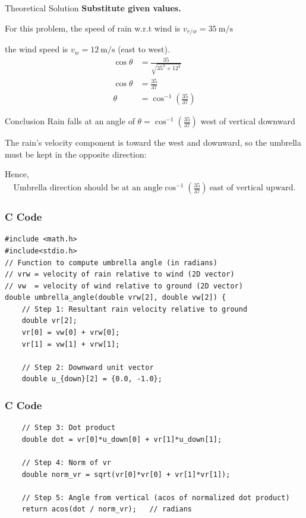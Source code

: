 \documentclass{beamer}
\begin{document}
\begin{frame}{Theoretical Solution}
\textbf{Substitute given values.}

For this problem, the speed of rain w.r.t wind is $v_{r/w}=35\ \text{m/s}$ 

the wind speed is $v_w=12\ \text{m/s}$ (east to west).
\begin{align}
    \cos\theta &= \frac{35}{\sqrt{35^2 + 12^2}} \\
    \cos\theta &= \frac{35}{37} \\ 
        \theta &= \cos^{-1}\!\left(\frac{35}{37}\right)
\end{align}

\end{frame}
\begin{frame}{Conclusion} 
Rain falls at an angle of 
$\theta=\cos^{-1}\!\left(\frac{35}{37}\right)$ west of vertical downward

The rain’s velocity component is toward the west and downward, so the umbrella must be kept in the opposite direction:

Hence,
\begin{align}
 \text{Umbrella direction should be at an angle} \cos^{-1}\!\left(\frac{35}{37}\right)\ \text{east of vertical upward.}
\end{align}

\end{frame}


\begin{frame}[fragile]
    \frametitle{C Code }
\begin{lstlisting}
#include <math.h>
#include<stdio.h>
// Function to compute umbrella angle (in radians)
// vrw = velocity of rain relative to wind (2D vector)
// vw  = velocity of wind relative to ground (2D vector)
double umbrella_angle(double vrw[2], double vw[2]) {
    // Step 1: Resultant rain velocity relative to ground
    double vr[2];
    vr[0] = vw[0] + vrw[0];
    vr[1] = vw[1] + vrw[1];

    // Step 2: Downward unit vector
    double u_{down}[2] = {0.0, -1.0};
 \end{lstlisting}
\end{frame}
\begin{frame}[fragile]
    \frametitle{C Code }
    
\begin{lstlisting}
    // Step 3: Dot product
    double dot = vr[0]*u_down[0] + vr[1]*u_down[1];

    // Step 4: Norm of vr
    double norm_vr = sqrt(vr[0]*vr[0] + vr[1]*vr[1]);

    // Step 5: Angle from vertical (acos of normalized dot product)
    return acos(dot / norm_vr);   // radians

 \end{lstlisting}
\end{frame}
\end{document}
